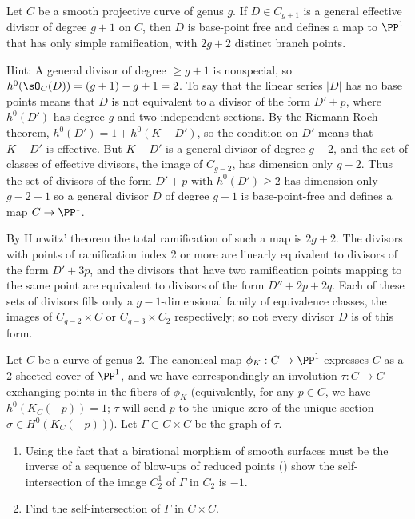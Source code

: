 \begin{exercise}[$g+1$ theorem]\label{g+1 theorem} 
Let $C$ be a smooth projective curve of genus $g$. If $D \in C_{g+1}$ is a general effective divisor of degree $g+1$ on $C$, then 
$D$ is base-point free and defines a  map to $\PP^1$ that has only simple ramification, with $2g+2$ distinct  branch points.

Hint: 
A general divisor of degree $\geq g+1$ is nonspecial, so $h^0(\sO_C(D)) = (g+1)-g+1 = 2$. To say that the linear series $|D|$ has no base points means that $D$ is not equivalent to a divisor of the form
$D'+p$, where $h^0(D')$ has degree $g$ and two independent sections. By the Riemann-Roch theorem, $h^0(D') = 1+h^0(K-D')$, so the condition on $D'$ means that $K-D'$ is effective. But $K-D'$ is a general divisor of degree $g-2$, and
the set of classes of effective divisors, the image of $C_{g-2}$, has dimension only $g-2$. 
Thus the set of divisors of the form $D'+p$ with $h^0(D') \geq 2$ has dimension only $g -2 +1$
so a general divisor $D$ of degree $g+1$ is base-point-free and defines a map $C\to \PP^1$. 

By Hurwitz' theorem the total ramification of such a map is $2g+2$. The divisors with points of ramification
index 2 or more are linearly equivalent to divisors of the form $D'+3p$, and the divisors that have two ramification
points mapping to the same point are equivalent to divisors of the form $D''+2p+2q$. Each of these sets
of divisors fills only a $g-1$-dimensional family of equivalence classes, the images of 
$C_{g-2}\times C$ or $C_{g-3}\times C_2$ respectively; so not every divisor $D$ is of this form.
\end{exercise}


\begin{exercise}\label{blow-up of $J(C)$ at a point}
Let $C$ be a curve of genus 2. The canonical map $\phi_K : C \to \PP^1$ expresses $C$ as a 2-sheeted cover of $\PP^1$, and we have correspondingly an involution $\tau : C \to C$ exchanging points in the fibers of $\phi_K$ (equivalently, for any $p \in C$, we have $h^0(K_C(-p)) = 1$; $\tau$ will send $p$ to the unique zero of the unique section $\sigma \in H^0(K_C(-p))$). Let $\Gamma \subset C \times C$ be the graph of $\tau$.
\begin{enumerate}
\item Using the fact that a birational morphism of smooth surfaces must be the inverse of a sequence of blow-ups of reduced points (\cite[V.5.5]{Hartshorne1977}) show the self-intersection of the image $C^1_2$ of $\Gamma$ in $C_2$ is $-1$.
\item Find the self-intersection of $\Gamma$ in $C \times C$.
\end{enumerate}
\end{exercise}



